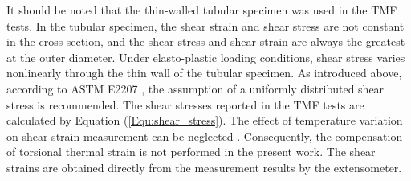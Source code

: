It should be noted that the thin-walled tubular specimen was used in the TMF tests. In the tubular specimen, the shear strain and shear stress are not constant in the cross-section, and the shear stress and shear strain are always the greatest at the outer diameter. Under elasto-plastic loading conditions, shear stress varies nonlinearly through the thin wall of the tubular specimen. As introduced above, according to ASTM E2207 \cite{ASTM2014}, the assumption of a uniformly distributed shear stress is recommended. The shear stresses reported in the TMF tests are calculated by Equation (\ref{Equ:shear_stress}). The effect of temperature variation on shear strain measurement can be neglected \cite{Bakis2014}. Consequently, the compensation of torsional thermal strain is not performed in the present work. The shear strains are obtained directly from the measurement results by the extensometer.

